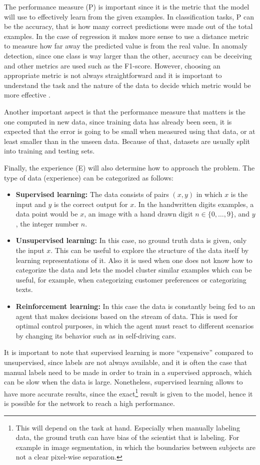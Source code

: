 The performance measure (P) is important since it is the metric that the model will use to effectively learn from the given examples. In classification tasks, P can be the accuracy, that is how many correct predictions were made out of the total examples. In the case of regression it makes more sense to use a distance metric to measure how far away the predicted value is from the real value. In anomaly detection, since one class is way larger than the other, accuracy can be deceiving and other metrics are used such as the F1-score. However, choosing an appropriate metric is not always straightforward and it is important to understand the task and the nature of the data to decide which metric would be more effective \cite{loss-survey}.

Another important aspect is that the performance measure that matters is the one computed in new data, since training data has already been seen, it is expected that the error is going to be small when measured using that data, or at least smaller than in the unseen data. Because of that, datasets are usually split into training and testing sets.

Finally, the experience (E) will also determine how to approach the problem. The type of data (experience) can be categorized as follows:
\begin{itemize}
    \item \textbf{Supervised learning:} The data consists of pairs $(x,y)$ in which $x$ is the input and $y$ is the correct output for $x$. In the handwritten digits examples, a data point would be $x$, an image with a hand drawn digit $n\in \{0,\ldots,9\}$, and $y$, the integer number $n$.
    \item \textbf{Unsupervised learning:} In this case, no ground truth data is given, only the input $x$. This can be useful to explore the structure of the data itself by learning representations of it. Also it is used when one does not know how to categorize the data and lets the model cluster similar examples which can be useful, for example, when categorizing customer preferences or categorizing texts.
    \item \textbf{Reinforcement learning:} In this case the data is constantly being fed to an agent that makes decisions based on the stream of data. This is used for optimal control purposes, in which the agent must react to different scenarios by changing its behavior such as in self-driving cars.
\end{itemize}

It is important to note that supervised learning is more “expensive” compared to unsupervised, since labels are not always available, and it is often the case that manual labels need to be made in order to train in a supervised approach, which can be slow when the data is large. Nonetheless, supervised learning allows to have more accurate results, since the exact\footnote{This will depend on the task at hand. Especially when manually labeling data, the ground truth can have bias of the scientist that is labeling. For example in image segmentation, in which the boundaries between subjects are not a clear pixel-wise separation.} result is given to the model, hence it is possible for the network to reach a high performance.

